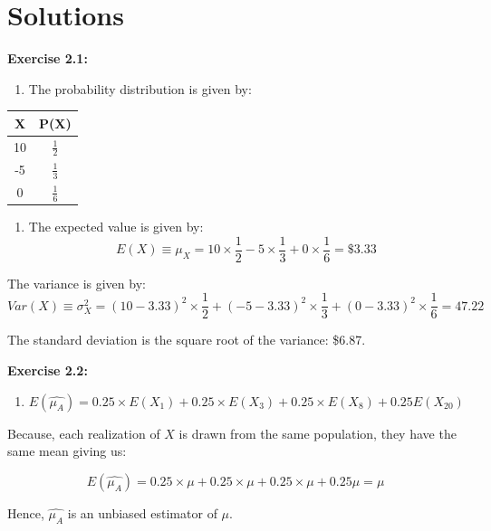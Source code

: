 \documentclass[
]{book}
\providecommand{\tightlist}{%
  \setlength{\itemsep}{0pt}\setlength{\parskip}{0pt}}
\theoremstyle{definition}
\theoremstyle{definition}
\theoremstyle{definition}
\theoremstyle{definition}
\theoremstyle{remark}
\begin{document}
\hypertarget{solutions-1}{%
\section*{Solutions}\label{solutions-1}}

\textbf{Exercise 2.1:}

\begin{enumerate}
\def\labelenumi{\alph{enumi}.}
\tightlist
\item
  The probability distribution is given by:
\end{enumerate}

\begin{longtable}[]{@{}cc@{}}
\toprule()
X & P(X) \\
\midrule()
\endhead
10 & \(\displaystyle \frac{1}{2}\) \\
-5 & \(\displaystyle \frac{1}{3}\) \\
0 & \(\displaystyle \frac{1}{6}\) \\
\bottomrule()
\end{longtable}

\begin{enumerate}
\def\labelenumi{\alph{enumi}.}
\setcounter{enumi}{1}
\tightlist
\item
  The expected value is given by:
  \[E(X)\equiv\mu_X= 10 \times \frac{1}{2}-5 \times \frac{1}{3} +0 \times \frac{1}{6}=\$3.33\]
\end{enumerate}

The variance is given by:
\[Var(X)\equiv\sigma^2_X= (10-3.33)^2 \times \frac{1}{2}+(-5-3.33)^2 \times \frac{1}{3} +(0 -3.33)^2\times \frac{1}{6}=47.22\]

The standard deviation is the square root of the variance: \$6.87.

\textbf{Exercise 2.2:}

\begin{enumerate}
\def\labelenumi{\alph{enumi}.}
\tightlist
\item
  \[E(\widehat{\mu_A})=0.25\times E(X_1) +0.25\times E(X_3)+ 0.25 \times E(X_8) + 0.25 E(X_{20})\]
\end{enumerate}

Because, each realization of \(X\) is drawn from the same population, they have the same mean giving us:

\[E(\widehat{\mu_A})=0.25\times \mu +0.25\times \mu+ 0.25 \times \mu + 0.25 \mu=\mu\]

Hence, \(\widehat{\mu_A}\) is an unbiased estimator of \(\mu\).
\end{document}

